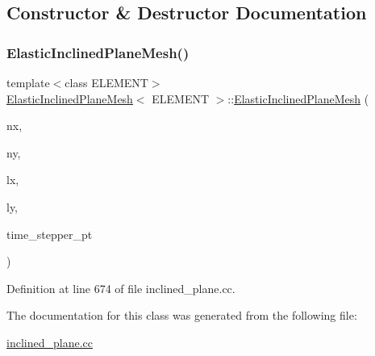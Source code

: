 \subsection{Constructor \& Destructor Documentation}
\mbox{\label{classElasticInclinedPlaneMesh_a61ba6d852505dd1353e791223fdfce04}} 
\subsubsection{\texorpdfstring{Elastic\+Inclined\+Plane\+Mesh()}{ElasticInclinedPlaneMesh()}}
{\footnotesize\ttfamily template$<$class E\+L\+E\+M\+E\+NT$>$ \\
\hyperlink{classElasticInclinedPlaneMesh}{Elastic\+Inclined\+Plane\+Mesh}$<$ E\+L\+E\+M\+E\+NT $>$\+::\hyperlink{classElasticInclinedPlaneMesh}{Elastic\+Inclined\+Plane\+Mesh} (\begin{DoxyParamCaption}\item[{const unsigned \&}]{nx,  }\item[{const unsigned \&}]{ny,  }\item[{const double \&}]{lx,  }\item[{const double \&}]{ly,  }\item[{Time\+Stepper $\ast$}]{time\+\_\+stepper\+\_\+pt }\end{DoxyParamCaption})\hspace{0.3cm}{\ttfamily [inline]}}



Definition at line 674 of file inclined\+\_\+plane.\+cc.



The documentation for this class was generated from the following file\+:\begin{DoxyCompactItemize}
\item 
\hyperlink{inclined__plane_8cc}{inclined\+\_\+plane.\+cc}\end{DoxyCompactItemize}
